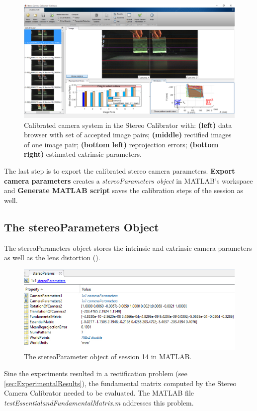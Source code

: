 \begin{figure}[htbp]
		\centering
		\includegraphics[width=1.0\textwidth]{figures/ExRectified}
		\caption[Calibrated camera system in MATLAB]{Calibrated camera system in the Stereo Calibrator with: \textbf{(left)} data browser with set of accepted image pairs; \textbf{(middle)} rectified images of one image pair; \textbf{(bottom left)} reprojection errors; \textbf{(bottom right)} estimated extrinsic parameters.}
		\label{fig:ExRectified}
\end{figure}

The last step is to export the calibrated stereo camera parameters. \textbf{Export camera parameters} creates a \textit{stereoParameters object} in MATLAB's workspace and \textbf{Generate MATLAB script} saves the calibration steps of the session as well.

\subsection{The stereoParameters Object}\label{ssec:stereoParamsObj}
The stereoParameters object stores the intrinsic and extrinsic camera parameters as well as the lens distortion (\cite{StereoCalib.2016}).

\begin{figure}[htbp]
		\centering
		\includegraphics[width=1.0\textwidth]{figures/StereoParams}
		\caption[The stereoParameter object of session 14 in MATLAB]{The stereoParameter object of session 14 in MATLAB.}
		\label{fig:StereoParams}
\end{figure}

Sine the experiments resulted in a rectification problem (see \autoref{sec:ExperimentalResults}), the fundamental matrix computed by the Stereo Camera Calibrator needed to be evaluated. The MATLAB file \textit{testEssentialandFundamentalMatrix.m} addresses this problem.